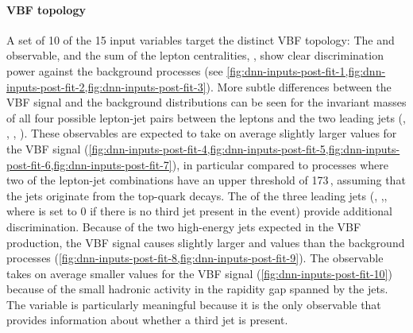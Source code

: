 \paragraph{VBF topology}
A set of 10 of the 15 input variables target the distinct VBF topology: The \mjj and \dyjj observable, and the sum of the lepton centralities, \lepetacent, show clear discrimination power against the background processes (see \cref{fig:dnn-inputs-post-fit-1,fig:dnn-inputs-post-fit-2,fig:dnn-inputs-post-fit-3}). More subtle differences between the VBF signal and the background distributions can be seen for the invariant masses of all four possible lepton-jet pairs between the leptons and the two leading jets (\mlonejone, \mlonejtwo, \mltwojone, \mltwojtwo). These observables are expected to take on average slightly larger values for the VBF signal (\cref{fig:dnn-inputs-post-fit-4,fig:dnn-inputs-post-fit-5,fig:dnn-inputs-post-fit-6,fig:dnn-inputs-post-fit-7}), in particular compared to \ttbar processes where two of the lepton-jet combinations have an upper threshold of 173\,\GeV, assuming that the jets originate from the top-quark decays.
The \pT of the three leading jets (\pTjone, \pTjtwo,\pTjthree, where \pTjthree is set to 0 if there is no third jet present in the event) provide additional discrimination.
Because of the two high-energy jets expected in the VBF production, the VBF signal causes slightly larger \pTjone and \pTjtwo values than the background processes (\cref{fig:dnn-inputs-post-fit-8,fig:dnn-inputs-post-fit-9}).
The \pTjthree observable takes on average smaller values for the VBF signal (\cref{fig:dnn-inputs-post-fit-10}) because of the small hadronic activity in the rapidity gap spanned by the jets. The \pTjthree variable is particularly meaningful because it is the only observable that provides information about whether a third jet is present.

